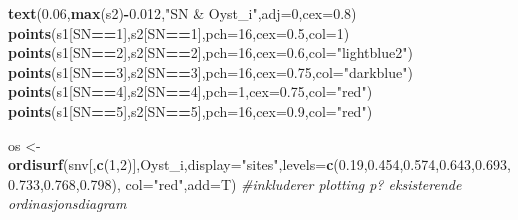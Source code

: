\documentclass[]{article}
\newenvironment{Shaded}{\begin{snugshade}}{\end{snugshade}}
\newcommand{\CommentTok}[1]{\textcolor[rgb]{0.56,0.35,0.01}{\textit{#1}}}
\newcommand{\DataTypeTok}[1]{\textcolor[rgb]{0.13,0.29,0.53}{#1}}
\newcommand{\DecValTok}[1]{\textcolor[rgb]{0.00,0.00,0.81}{#1}}
\newcommand{\FloatTok}[1]{\textcolor[rgb]{0.00,0.00,0.81}{#1}}
\newcommand{\KeywordTok}[1]{\textcolor[rgb]{0.13,0.29,0.53}{\textbf{#1}}}
\newcommand{\NormalTok}[1]{#1}
\newcommand{\OperatorTok}[1]{\textcolor[rgb]{0.81,0.36,0.00}{\textbf{#1}}}
\newcommand{\StringTok}[1]{\textcolor[rgb]{0.31,0.60,0.02}{#1}}
\begin{document}
\begin{Shaded}
\begin{Highlighting}[]
\KeywordTok{text}\NormalTok{(}\FloatTok{0.06}\NormalTok{,}\KeywordTok{max}\NormalTok{(s2)}\OperatorTok{-}\FloatTok{0.012}\NormalTok{,}\StringTok{"SN & Oyst_i"}\NormalTok{,}\DataTypeTok{adj=}\DecValTok{0}\NormalTok{,}\DataTypeTok{cex=}\FloatTok{0.8}\NormalTok{)}
\KeywordTok{points}\NormalTok{(s1[SN}\OperatorTok{==}\DecValTok{1}\NormalTok{],s2[SN}\OperatorTok{==}\DecValTok{1}\NormalTok{],}\DataTypeTok{pch=}\DecValTok{16}\NormalTok{,}\DataTypeTok{cex=}\FloatTok{0.5}\NormalTok{,}\DataTypeTok{col=}\DecValTok{1}\NormalTok{)}
\KeywordTok{points}\NormalTok{(s1[SN}\OperatorTok{==}\DecValTok{2}\NormalTok{],s2[SN}\OperatorTok{==}\DecValTok{2}\NormalTok{],}\DataTypeTok{pch=}\DecValTok{16}\NormalTok{,}\DataTypeTok{cex=}\FloatTok{0.6}\NormalTok{,}\DataTypeTok{col=}\StringTok{"lightblue2"}\NormalTok{)}
\KeywordTok{points}\NormalTok{(s1[SN}\OperatorTok{==}\DecValTok{3}\NormalTok{],s2[SN}\OperatorTok{==}\DecValTok{3}\NormalTok{],}\DataTypeTok{pch=}\DecValTok{16}\NormalTok{,}\DataTypeTok{cex=}\FloatTok{0.75}\NormalTok{,}\DataTypeTok{col=}\StringTok{"darkblue"}\NormalTok{)}
\KeywordTok{points}\NormalTok{(s1[SN}\OperatorTok{==}\DecValTok{4}\NormalTok{],s2[SN}\OperatorTok{==}\DecValTok{4}\NormalTok{],}\DataTypeTok{pch=}\DecValTok{1}\NormalTok{,}\DataTypeTok{cex=}\FloatTok{0.75}\NormalTok{,}\DataTypeTok{col=}\StringTok{"red"}\NormalTok{)}
\KeywordTok{points}\NormalTok{(s1[SN}\OperatorTok{==}\DecValTok{5}\NormalTok{],s2[SN}\OperatorTok{==}\DecValTok{5}\NormalTok{],}\DataTypeTok{pch=}\DecValTok{16}\NormalTok{,}\DataTypeTok{cex=}\FloatTok{0.9}\NormalTok{,}\DataTypeTok{col=}\StringTok{"red"}\NormalTok{)}

\NormalTok{os <-}\StringTok{ }\KeywordTok{ordisurf}\NormalTok{(snv[,}\KeywordTok{c}\NormalTok{(}\DecValTok{1}\NormalTok{,}\DecValTok{2}\NormalTok{)],Oyst_i,}\DataTypeTok{display=}\StringTok{"sites"}\NormalTok{,}\DataTypeTok{levels=}\KeywordTok{c}\NormalTok{(}\FloatTok{0.19}\NormalTok{,}\FloatTok{0.454}\NormalTok{,}\FloatTok{0.574}\NormalTok{,}\FloatTok{0.643}\NormalTok{,}\FloatTok{0.693}\NormalTok{,}\FloatTok{0.733}\NormalTok{,}\FloatTok{0.768}\NormalTok{,}\FloatTok{0.798}\NormalTok{), }\DataTypeTok{col=}\StringTok{"red"}\NormalTok{,}\DataTypeTok{add=}\NormalTok{T) }\CommentTok{#inkluderer plotting p? eksisterende ordinasjonsdiagram}
\end{Highlighting}
\end{Shaded}
\end{document}
